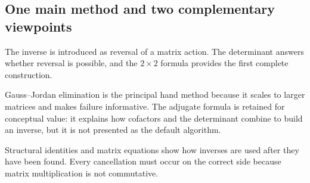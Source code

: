 \subsection{One main method and two complementary viewpoints}

\begin{corebox}
The inverse is introduced as reversal of a matrix action. The determinant answers whether reversal is possible, and the $2\times2$ formula provides the first complete construction.
\end{corebox}

\begin{corebox}
Gauss--Jordan elimination is the principal hand method because it scales to larger matrices and makes failure informative. The adjugate formula is retained for conceptual value: it explains how cofactors and the determinant combine to build an inverse, but it is not presented as the default algorithm.
\end{corebox}

Structural identities and matrix equations show how inverses are used after they have been found. Every cancellation must occur on the correct side because matrix multiplication is not commutative.
